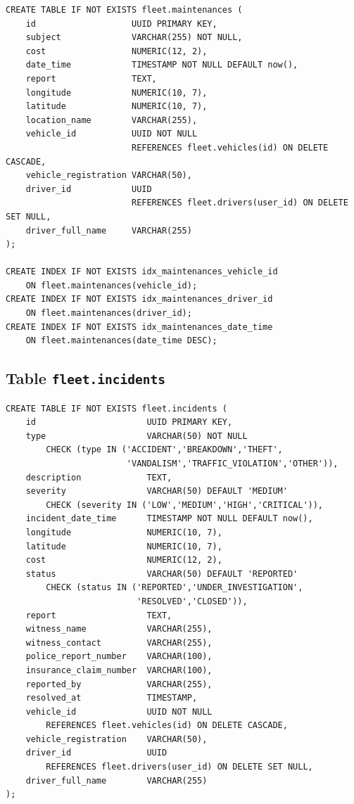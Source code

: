 \documentclass[12pt,a4paper]{report}
\begin{document}
\begin{lstlisting}[style=sqlStyle, caption={Création de la table fleet.maintenances}]
CREATE TABLE IF NOT EXISTS fleet.maintenances (
    id                   UUID PRIMARY KEY,
    subject              VARCHAR(255) NOT NULL,
    cost                 NUMERIC(12, 2),
    date_time            TIMESTAMP NOT NULL DEFAULT now(),
    report               TEXT,
    longitude            NUMERIC(10, 7),
    latitude             NUMERIC(10, 7),
    location_name        VARCHAR(255),
    vehicle_id           UUID NOT NULL
                         REFERENCES fleet.vehicles(id) ON DELETE CASCADE,
    vehicle_registration VARCHAR(50),
    driver_id            UUID
                         REFERENCES fleet.drivers(user_id) ON DELETE SET NULL,
    driver_full_name     VARCHAR(255)
);

CREATE INDEX IF NOT EXISTS idx_maintenances_vehicle_id
    ON fleet.maintenances(vehicle_id);
CREATE INDEX IF NOT EXISTS idx_maintenances_driver_id
    ON fleet.maintenances(driver_id);
CREATE INDEX IF NOT EXISTS idx_maintenances_date_time
    ON fleet.maintenances(date_time DESC);
\end{lstlisting}

\subsection{Table \texttt{fleet.incidents}}

\begin{lstlisting}[style=sqlStyle, caption={Création de la table fleet.incidents}]
CREATE TABLE IF NOT EXISTS fleet.incidents (
    id                      UUID PRIMARY KEY,
    type                    VARCHAR(50) NOT NULL
        CHECK (type IN ('ACCIDENT','BREAKDOWN','THEFT',
                        'VANDALISM','TRAFFIC_VIOLATION','OTHER')),
    description             TEXT,
    severity                VARCHAR(50) DEFAULT 'MEDIUM'
        CHECK (severity IN ('LOW','MEDIUM','HIGH','CRITICAL')),
    incident_date_time      TIMESTAMP NOT NULL DEFAULT now(),
    longitude               NUMERIC(10, 7),
    latitude                NUMERIC(10, 7),
    cost                    NUMERIC(12, 2),
    status                  VARCHAR(50) DEFAULT 'REPORTED'
        CHECK (status IN ('REPORTED','UNDER_INVESTIGATION',
                          'RESOLVED','CLOSED')),
    report                  TEXT,
    witness_name            VARCHAR(255),
    witness_contact         VARCHAR(255),
    police_report_number    VARCHAR(100),
    insurance_claim_number  VARCHAR(100),
    reported_by             VARCHAR(255),
    resolved_at             TIMESTAMP,
    vehicle_id              UUID NOT NULL
        REFERENCES fleet.vehicles(id) ON DELETE CASCADE,
    vehicle_registration    VARCHAR(50),
    driver_id               UUID
        REFERENCES fleet.drivers(user_id) ON DELETE SET NULL,
    driver_full_name        VARCHAR(255)
);
\end{lstlisting}
\end{document}
